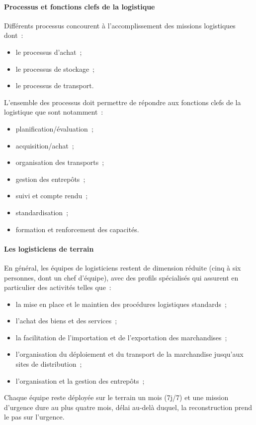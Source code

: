 \paragraph{Processus et fonctions clefs de la logistique}
Différents processus concourent à l'accomplissement des missions logistiques dont~:
\begin{itemize}
	\item le processus d'achat~;
	\item le processus de stockage~;
	\item le processus de transport.
\end{itemize}
L'ensemble des processus doit permettre de répondre aux fonctions clefs de la logistique que sont notamment~:
\begin{itemize}
	\item planification/évaluation~;
	\item acquisition/achat~;
	\item organisation des transports~;
	\item gestion des entrepôts~;
	\item suivi et compte rendu~;
	\item standardisation~;
	\item formation et renforcement des capacités.
\end{itemize}

\paragraph{Les logisticiens de terrain}
En général, les équipes de logisticiens restent de dimension réduite (cinq à six personnes, dont un chef d'équipe), avec des profils spécialisés qui assurent en particulier des activités telles que~:
\begin{itemize}
	\item la mise en place et le maintien des procédures logistiques standards~;
	\item l'achat des biens et des services~;
	\item la facilitation de l'importation et de l'exportation des marchandises~;
	\item l'organisation du déploiement et du transport de la marchandise jusqu'aux sites de distribution~;
	\item l'organisation et la gestion des entrepôts~;
\end{itemize}
Chaque équipe reste déployée sur le terrain un mois (7j/7) et une mission d'urgence dure au plus quatre mois, délai au-delà duquel, la reconstruction prend le pas sur l'urgence.

